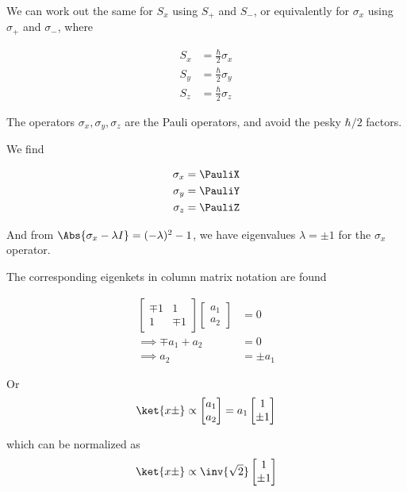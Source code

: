 We can work out the same for $S_x$ using $S_{+}$ and $S_{-}$, or equivalently for $\sigma_x$ using $\sigma_{+}$ and $\sigma_{-}$, where

\begin{align}\label{eqn:PHY356Foct19:2009}
S_x &= \frac{\hbar}{2} \sigma_x \\
S_y &= \frac{\hbar}{2} \sigma_y \\
S_z &= \frac{\hbar}{2} \sigma_z
\end{align}

The operators $\sigma_x, \sigma_y, \sigma_z$ are the Pauli operators, and avoid the pesky $\hbar/2$ factors.

We find

\begin{align}\label{eqn:PHY356Foct19:2010}
\sigma_x &= \PauliX \\
\sigma_y &= \PauliY \\
\sigma_z &= \PauliZ
\end{align}

And from $\Abs{\sigma_x - \lambda I} = (-\lambda)^2 -1$, we have eigenvalues $\lambda = \pm 1$ for the $\sigma_x$ operator.

The corresponding eigenkets in column matrix notation are found 

\begin{align*}
\begin{bmatrix}
\mp 1 & 1 \\
1 & \mp 1 
\end{bmatrix}
\begin{bmatrix}
a_1 \\
a_2 
\end{bmatrix}
&= 0 \\
\implies
\mp a_1 + a_2 &= 0 \\
\implies
a_2 &= \pm a_1
\end{align*}

Or
\begin{align*}
\ket{x\pm} \propto 
\begin{bmatrix}
a_1 \\
a_2 
\end{bmatrix}
=
a_1
\begin{bmatrix}
1 \\
\pm 1 
\end{bmatrix}
\end{align*}

which can be normalized as
\begin{align}\label{eqn:PHY356Foct19:2011}
\ket{x\pm} \propto 
\inv{\sqrt{2}}
\begin{bmatrix}
1 \\
\pm 1 
\end{bmatrix}
\end{align}

